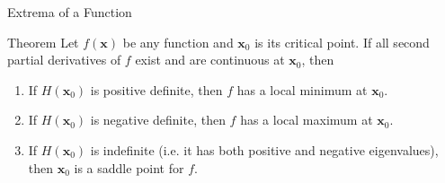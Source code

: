 \documentclass{beamer}
\newcommand{\vx}{\mathbf{x}}
\begin{document}
\begin{frame}{Extrema of a Function}
      \begin{block}{Theorem}
          Let \( f(\vx) \) be any function and \( \vx_0 \) is its critical point. If all second partial derivatives of \( f \) exist and are continuous at \( \vx_0 \), then

\begin{enumerate}
    \item If \( H(\vx_0) \) is positive definite, then \( f \) has a local minimum at \( \vx_0 \).
    \item If \( H(\vx_0) \) is negative definite, then \( f \) has a local maximum at \( \vx_0 \).
    \item If \( H(\vx_0) \) is indefinite (i.e. it has both positive and negative eigenvalues), then \( \vx_0 \) is a saddle point for \( f \).
\end{enumerate}
      \end{block}



\end{frame}






%  
    

  
\end{document}
